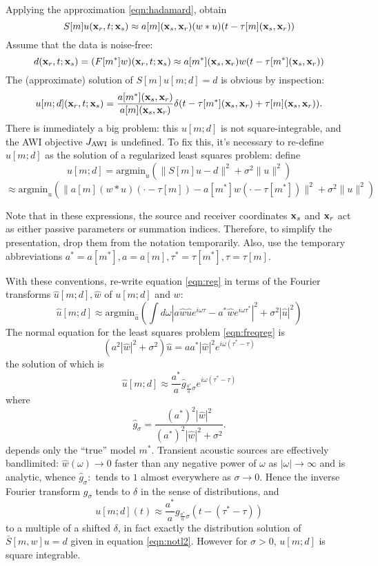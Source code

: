 Applying the approximation \ref{eqn:hadamard}, obtain
\begin{equation}
  \label{eqn:spwe}
S[m]u({\bf x}_r,t;{\bf x}_s) \approx a[m]({\bf x}_s,{\bf x}_r) (w*u)(t-\tau[m]({\bf x}_s,{\bf x}_r))
\end{equation}
Assume that the data is noise-free:
$$
d({\bf x}_r,t;{\bf x}_s)=(F[m^*]w) ({\bf x}_r,t;{\bf x}_s) \approx a[m^*]({\bf x}_s,{\bf x}_r) w(t-\tau[m^*]({\bf x}_s,{\bf x}_r))
$$
The (approximate) solution of $S[m]u[m;d]=d$ is obvious by inspection:
\begin{equation}
  \label{eqn:notl2}
  u[m;d]({\bf x}_r,t;{\bf x}_s) = \frac{a[m^*]({\bf x}_s,{\bf x}_r)}{a[m]({\bf x}_s,{\bf x}_r)}\delta(t-\tau[m^*]({\bf x}_s,{\bf x}_r)+\tau[m]({\bf x}_s,{\bf x}_r)).
\end{equation}
There is immediately a big problem: this $u[m;d]$ is not square-integrable, and the AWI objective $J_{\rm AWI}$ is undefined. To fix this, it's necessary to re-define $u[m;d]$ as the solution of a regularized least squares problem: define
\begin{equation}
  \label{eqn:reg}
  u[m;d] = \mbox{argmin}_u (\|S[m]u-d\|^2 + \sigma^2\|u\|^2)
\end{equation}
$$
\approx \mbox{argmin}_u (\|a[m](w*u)(\cdot-\tau[m])-a[m^*]w(\cdot-\tau[m^*])\|^2 + \sigma^2\|u\|^2)
$$

Note that in these expressions, the source and receiver
coordinates ${\bf x}_s$ and ${\bf x}_r$ act as either passive parameters
or summation indices. Therefore, to simplify the presentation, drop them from the notation
temporarily. Also,  use the temporary abbreviations $a^*=a[m^*], a=a[m], \tau^*=\tau[m^*],
\tau=\tau[m]$.

With these conventions, re-write equation \ref{eqn:reg} in terms of the Fourier transforms $\hat{u}[m;d],\hat{w}$ of $u[m;d]$ and $w$:
\begin{equation}
  \label{eqn:freqreg}
\hat{u}[m;d] \approx \mbox{argmin}_{\hat{u}}\left(\int d\omega |a\hat{w}\hat{u}e^{i\omega \tau}-a^*\hat{w}e^{i\omega\tau^*}|^2 + \sigma^2 |\hat{u}|^2\right)
\end{equation}
The normal equation for the least squares problem \ref{eqn:freqreg} is
$$
(a^2 |\hat{w}|^2 +\sigma^2)\hat{u} = a a^*|\hat{w}|^2e^{i\omega(\tau^*-\tau)}
$$
the solution of which is
$$
\hat{u}[m;d] \approx \frac{a^*}{a}\hat{g}_{\frac{a^*}{a}\sigma} e^{i\omega(\tau^*-\tau)}
$$
where
$$ 
\hat{g}_{\sigma} = \frac{(a^*)^2|\hat{w}|^2}{(a^*)^2|\hat{w}|^2 + \sigma^2}.
$$
depends only the ``true'' model $m^*$. Transient acoustic sources are effectively bandlimited: $\hat{w}(\omega) \rightarrow 0$ faster than any negative power of $\omega$ as $|\omega| \rightarrow \infty$ and is analytic, whence $\hat{g}_{\sigma}:$ tends to $1$ almost everywhere as $\sigma \rightarrow 0$. Hence the inverse Fourier transform $g_{\sigma}$ tends to $\delta$ in the sense of distributions, and 
$$
u[m;d](t) \approx \frac{a^*}{a}g_{\frac{a^*}{a}\sigma}(t-(\tau^*-\tau))
$$
to a multiple of a shifted $\delta$, in fact exactly the distribution
solution of $\bar{S}[m,w]u=d$ given in equation \ref{eqn:notl2}. However for $\sigma>0$, $u[m;d]$ is square integrable.


